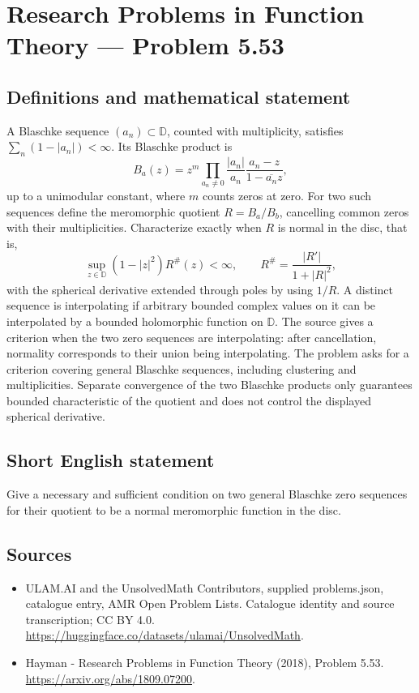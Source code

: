 \documentclass[11pt,a4paper]{article}
\begin{document}
\section*{Research Problems in Function Theory — Problem 5.53}\label{statement}

\subsection{Definitions and mathematical statement}
A Blaschke sequence $(a_n)\subset\mathbb D$, counted with multiplicity, satisfies $\sum_n(1-|a_n|)<\infty$. Its Blaschke product is
\[
B_a(z)=z^m\prod_{a_n\ne0}\frac{|a_n|}{a_n}\frac{a_n-z}{1-\overline{a_n}z},
\]
up to a unimodular constant, where $m$ counts zeros at zero. For two such sequences define the meromorphic quotient $R=B_a/B_b$, cancelling common zeros with their multiplicities.
Characterize exactly when $R$ is normal in the disc, that is,
\[
\sup_{z\in\mathbb D}(1-|z|^2)R^{\#}(z)<\infty,
\qquad R^{\#}=\frac{|R'|}{1+|R|^2},
\]
with the spherical derivative extended through poles by using $1/R$.
A distinct sequence is interpolating if arbitrary bounded complex values on it can be interpolated by a bounded holomorphic function on $\mathbb D$. The source gives a criterion when the two zero sequences are interpolating: after cancellation, normality corresponds to their union being interpolating. The problem asks for a criterion covering general Blaschke sequences, including clustering and multiplicities. Separate convergence of the two Blaschke products only guarantees bounded characteristic of the quotient and does not control the displayed spherical derivative.
\subsection{Short English statement}
Give a necessary and sufficient condition on two general Blaschke zero sequences for their quotient to be a normal meromorphic function in the disc.
\subsection{Sources}
\begin{itemize}
\item[S1] ULAM.AI and the UnsolvedMath Contributors, supplied problems.json, catalogue entry, AMR Open Problem Lists. Catalogue identity and source transcription; CC BY 4.0.
\url{https://huggingface.co/datasets/ulamai/UnsolvedMath}.
\item[S2] Hayman - Research Problems in Function Theory (2018), Problem 5.53. 
\url{https://arxiv.org/abs/1809.07200}.
\end{itemize}
\end{document}
